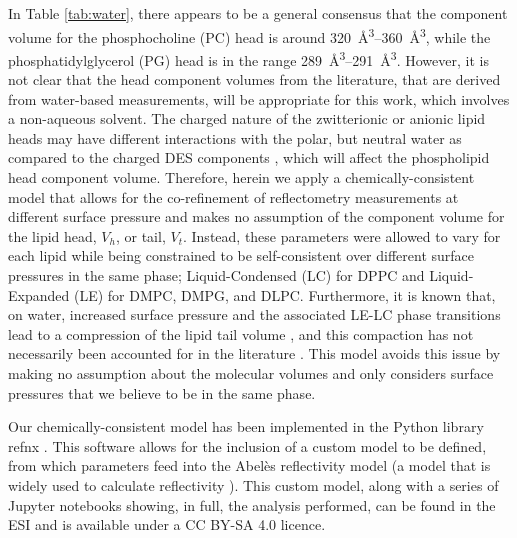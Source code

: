 \documentclass[amsmath,amssymb,twocolumn,superscriptaddress]{revtex4-1}
\begin{document}
In Table \ref{tab:water}, there appears to be a general consensus that the component volume for the phosphocholine (PC) head is around \SIrange{320}{360}{\angstrom\cubed}, while the phosphatidylglycerol (PG) head is in the range \SIrange{289}{291}{\angstrom\cubed}.
However, it is not clear that the head component volumes from the literature, that are derived from water-based measurements, will be appropriate for this work, which involves a non-aqueous solvent.
The charged nature of the zwitterionic or anionic lipid heads may have different interactions with the polar, but neutral water as compared to the charged DES components \cite{sanchez-fernandez_self-assembly_2018}, which will affect the phospholipid head component volume.
Therefore, herein we apply a chemically-consistent model that allows for the co-refinement of reflectometry measurements at different surface pressure and makes no assumption of the component volume for the lipid head, $V_h$, or tail, $V_t$.
Instead, these parameters were allowed to vary for each lipid while being constrained to be self-consistent over different surface pressures in the same phase; Liquid-Condensed (LC) for DPPC and Liquid-Expanded (LE) for DMPC, DMPG, and DLPC.
Furthermore, it is known that, on water, increased surface pressure and the associated LE-LC phase transitions lead to a compression of the lipid tail volume \cite{marsh_molecular_2010,small_lateral_1984}, and this compaction has not necessarily been accounted for in the literature \cite{campbell_structure_2018}.
This model avoids this issue by making no assumption about the molecular volumes and only considers surface pressures that we believe to be in the same phase.

Our chemically-consistent model has been implemented in the Python library refnx \cite{nelson_refnx_2019,nelson_refnx_2018-1}.
This software allows for the inclusion of a custom model to be defined, from which parameters feed into the Abel\`{e}s reflectivity model (a model that is widely used to calculate reflectivity \cite{abeles_sur_1948,parratt_surface_1954}).
This custom model, along with a series of Jupyter notebooks showing, in full, the analysis performed, can be found in the ESI and is available under a CC BY-SA 4.0 licence.
\end{document}

